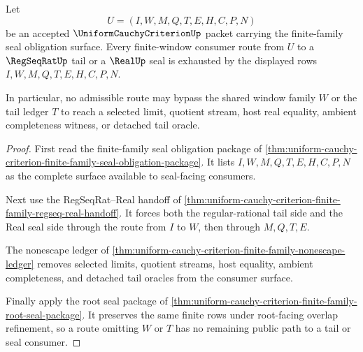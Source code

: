 \begin{theorem}
\label{thm:uniform-cauchy-criterion-finite-family-window-seal-exhaustion}
Let
$$
U=(I,W,M,Q,T,E,H,C,P,N)
$$
be an accepted $\UniformCauchyCriterionUp$ packet carrying the finite-family seal obligation surface. Every finite-window consumer route from $U$ to a $\RegSeqRatUp$ tail or a $\RealUp$ seal is exhausted by the displayed rows $I,W,M,Q,T,E,H,C,P,N$.

In particular, no admissible route may bypass the shared window family $W$ or the tail ledger $T$ to reach a selected limit, quotient stream, host real equality, ambient completeness witness, or detached tail oracle.
\end{theorem}
\begin{proof}
First read the finite-family seal obligation package of \autoref{thm:uniform-cauchy-criterion-finite-family-seal-obligation-package}. It lists $I,W,M,Q,T,E,H,C,P,N$ as the complete surface available to seal-facing consumers.

Next use the RegSeqRat--Real handoff of \autoref{thm:uniform-cauchy-criterion-finite-family-regseq-real-handoff}. It forces both the regular-rational tail side and the Real seal side through the route from $I$ to $W$, then through $M,Q,T,E$.

The nonescape ledger of \autoref{thm:uniform-cauchy-criterion-finite-family-nonescape-ledger} removes selected limits, quotient streams, host equality, ambient completeness, and detached tail oracles from the consumer surface.

Finally apply the root seal package of \autoref{thm:uniform-cauchy-criterion-finite-family-root-seal-package}. It preserves the same finite rows under root-facing overlap refinement, so a route omitting $W$ or $T$ has no remaining public path to a tail or seal consumer.
\end{proof}


